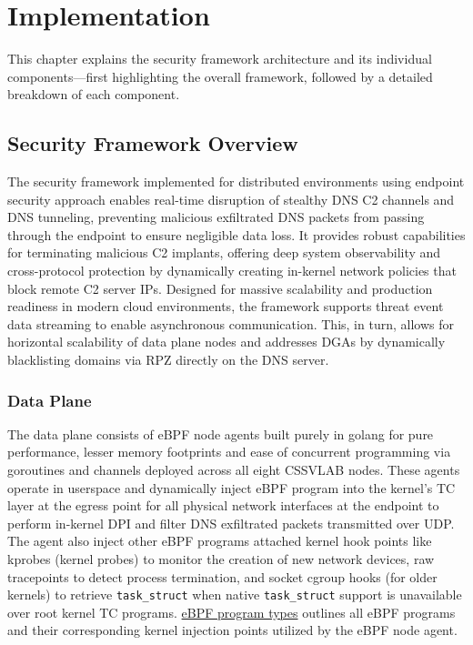 \documentclass [11pt, proquest] {uwthesis}[2020/02/24]
\begin{document}
\chapter{Implementation}
This chapter explains the security framework architecture and its individual components—first highlighting the overall framework, followed by a detailed breakdown of each component.
\section{Security Framework Overview}
The security framework implemented for distributed environments using endpoint security approach enables real-time disruption of stealthy DNS C2 channels and DNS tunneling, preventing malicious exfiltrated DNS packets from passing through the endpoint to ensure negligible data loss. It provides robust capabilities for terminating malicious C2 implants, offering deep system observability and cross-protocol protection by dynamically creating in-kernel network policies that block remote C2 server IPs. Designed for massive scalability and production readiness in modern cloud environments, the framework supports threat event data streaming to enable asynchronous communication. This, in turn, allows for horizontal scalability of data plane nodes and addresses DGAs by dynamically blacklisting domains via RPZ directly on the DNS server. 
\subsection{Data Plane}
The data plane consists of eBPF node agents built purely in golang for pure performance, lesser memory footprints and ease of concurrent programming via goroutines and channels deployed across all eight CSSVLAB nodes. These agents operate in userspace and dynamically inject eBPF program into the kernel’s TC layer at the egress point for all physical network interfaces at the endpoint to perform in-kernel DPI and filter DNS exfiltrated packets transmitted over UDP. The agent also inject other eBPF programs attached  kernel hook points like kprobes (kernel probes) to monitor the creation of new network devices, raw tracepoints to detect process termination, and socket cgroup hooks (for older kernels) to retrieve \texttt{task\_struct} when native \texttt{task\_struct} support is unavailable over root kernel TC programs.  \hyperref[sec:dp_kernel_prog_ty]{eBPF program types} outlines all eBPF programs and their corresponding kernel injection points utilized by the eBPF node agent.
\end{document}
